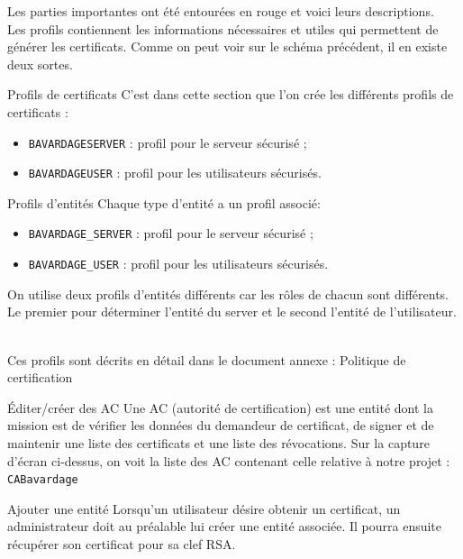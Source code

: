 \documentclass[a4paper,11pt,french]{book}
\begin{document}
Les parties importantes ont été entourées en rouge et voici leurs descriptions.\\

Les profils contiennent les informations nécessaires et utiles qui permettent de générer les certificats. Comme on peut voir sur le schéma précédent, il en existe deux sortes.
\begin{paragraph}{Profils de certificats}
C'est dans cette section que l'on crée les différents profils de certificats :
\begin{itemize}
\item \verb+BAVARDAGESERVER+ : profil pour le serveur sécurisé ;
\item \verb+BAVARDAGEUSER+ : profil pour les utilisateurs sécurisés.
\end{itemize}

\begin{paragraph}{Profils d'entités}
Chaque type d'entité a un profil associé:
\begin{itemize}
\item \verb+BAVARDAGE_SERVER+ : profil pour le serveur sécurisé ;
\item \verb+BAVARDAGE_USER+ : profil pour les utilisateurs sécurisés.
\end{itemize}
On utilise deux profils d'entités différents car les rôles de chacun sont différents. Le premier pour déterminer l'entité du server et le second l'entité de l'utilisateur.
\end{paragraph}
\end{paragraph}
\\
Ces profils sont décrits en détail dans le document annexe : Politique de certification


\begin{paragraph}{Éditer/créer des AC}
Une AC (autorité de certification) est une entité dont la mission est de vérifier les données du demandeur de certificat, de signer et de maintenir une liste des certificats et une liste des révocations. Sur la capture d'écran ci-dessus, on voit la liste des AC contenant celle relative à notre projet : \verb+CABavardage+
\end{paragraph}


\begin{paragraph}{Ajouter une entité}
Lorsqu'un utilisateur désire obtenir un certificat, un administrateur doit au préalable lui créer une entité associée. Il pourra ensuite récupérer son certificat pour sa clef RSA.
\end{paragraph}
\end{document}
